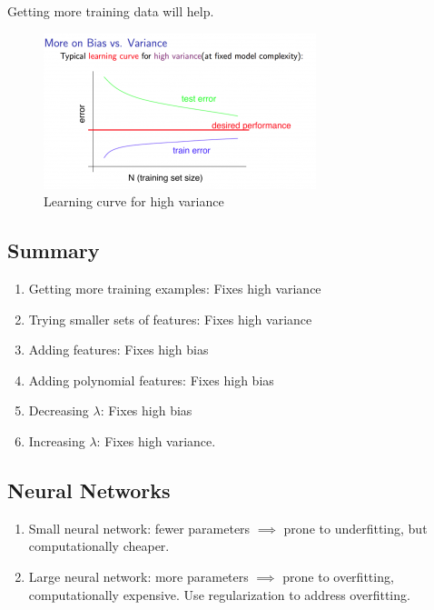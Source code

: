         Getting more training data will help. 
        \begin{figure}[htbp]
            \centering
            \includegraphics[width=\textwidth]{image/learning-curve-high-variance.png}
            \caption{Learning curve for high variance}
            \label{fig:learning-curve-high-variance}
        \end{figure}

\subsection{Summary}
    \begin{enumerate}
        \item Getting more training examples: Fixes high variance
        \item Trying smaller sets of features: Fixes high variance
        \item Adding features: Fixes high bias
        \item Adding polynomial features: Fixes high bias
        \item Decreasing $\lambda$: Fixes high bias
        \item Increasing $\lambda$: Fixes high variance.
    \end{enumerate}
\subsection {Neural Networks}
    \begin{enumerate}
        \item Small neural network: fewer parameters $\implies$ prone to underfitting, but computationally cheaper. 
        \item Large neural network: more parameters $\implies$ prone to overfitting, computationally expensive. Use regularization to address overfitting. 
    \end{enumerate}
    
